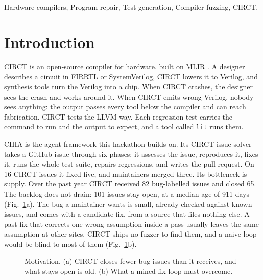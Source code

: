 \documentclass[conference]{IEEEtran}
\begin{document}
\begin{IEEEkeywords}
Hardware compilers, Program repair, Test generation, Compiler fuzzing, CIRCT.
\end{IEEEkeywords}


\section{Introduction}
CIRCT is an open-source compiler for hardware, built on MLIR \cite{mlir}. A
designer describes a circuit in FIRRTL or SystemVerilog, CIRCT lowers it to
Verilog, and synthesis tools turn the Verilog into a chip. When CIRCT crashes,
the designer sees the crash and works around it. When CIRCT emits wrong Verilog,
nobody sees anything: the output passes every tool below the compiler and can
reach fabrication. CIRCT tests the LLVM way. Each regression test carries the
command to run and the output to expect, and a tool called \texttt{lit} runs
them.

CHIA \cite{chia} is the agent framework this hackathon builds on. Its CIRCT
issue solver takes a GitHub issue through six phases: it assesses the issue,
reproduces it, fixes it, runs the whole test suite, repairs regressions, and
writes the pull request. On 16 CIRCT issues it fixed five, and maintainers
merged three. Its bottleneck is supply. Over the past year CIRCT received 82
bug-labelled issues and closed 65. The backlog does not drain: 101 issues stay
open, at a median age of 911 days (Fig.~\ref{fig:motiv}a). %
The bug a maintainer wants is small, already checked
against known issues, and comes with a candidate fix, from a source that files
nothing else. A past fix that corrects one wrong assumption inside a pass usually leaves the same assumption at other
sites. CIRCT ships no fuzzer to find them, and a naive loop would be blind to
most of them (Fig.~\ref{fig:motiv}b).

\begin{figure}[!t]
\centering

\vspace{-5pt}
\caption{Motivation. (a) CIRCT closes fewer bug issues than it receives,
and what stays open is old. (b) What a mined-fix loop must overcome.}
\label{fig:motiv}
\end{figure}
\end{document}
